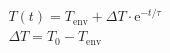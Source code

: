 \begin{gather}
    T(t) = T_{\mathrm{env}} + \Delta T \cdot \mathrm{e}^{-t/\tau} \\
    \Delta T = T_0 - T_{\mathrm{env}}
\end{gather}
